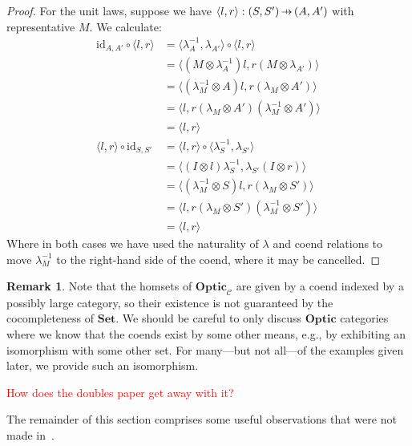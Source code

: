\documentclass[11pt,a4paper]{article}
\theoremstyle{plain}
\theoremstyle{definition}
\newtheorem{remark}[theorem]{Remark}
\newcommand{\C}{\mathscr{C}}
\newcommand{\Set}{\mathbf{Set}}
\newcommand{\Optic}{\mathbf{Optic}}
\newcommand{\id}{\mathrm{id}}
\newcommand{\hto}{\ensuremath{\,\mathaccent\shortmid\rightarrow\,}}
\newcommand{\todo}[1]{\textcolor{red}{\small #1}}
\begin{document}
\begin{proof}
  For the unit laws, suppose we have $\langle l, r \rangle : (S, S') \hto (A, A')$ with representative $M$. We calculate:
  \begin{align*}
    \id_{A, A'} \circ \langle l, r\rangle
    &= \langle \lambda^{-1}_A, \lambda_{A'} \rangle \circ \langle l, r\rangle \\
    &= \langle (M \otimes \lambda^{-1}_A) l, r (M\otimes  \lambda_{A'})\rangle \\
    &= \langle (\lambda^{-1}_M \otimes  A) l, r (\lambda_M \otimes A')\rangle \\
    &= \langle l, r (\lambda_M \otimes A') (\lambda^{-1}_M \otimes A')\rangle \\
    &= \langle l, r \rangle  \\
    \langle l, r \rangle \circ \id_{S, S'}
    &= \langle l, r \rangle \circ \langle \lambda^{-1}_S, \lambda_{S'}\rangle  \\
    &= \langle (I \otimes l)\lambda^{-1}_S, \lambda_{S'} (I \otimes r) \rangle \\
    &= \langle (\lambda^{-1}_M \otimes S)l, r (\lambda_{M} \otimes S') \rangle \\
    &= \langle l, r (\lambda_{M} \otimes S')(\lambda^{-1}_M \otimes S') \rangle \\
    &= \langle l, r \rangle
  \end{align*}
  Where in both cases we have used the naturality of $\lambda$ and coend relations to move $\lambda^{-1}_M$ to the right-hand side of the coend, where it may be cancelled.
\end{proof}

\begin{remark}
  Note that the homsets of $\Optic_\C$ are given by a coend indexed by a possibly large category, so their existence is not guaranteed by the cocompleteness of $\Set$. We should be careful to only discuss $\Optic$ categories where we know that the coends exist by some other means, e.g., by exhibiting an isomorphism with some other set. For many---but not all---of the examples given later, we provide such an isomorphism.

  \todo{How does the doubles paper get away with it?}
\end{remark}

The remainder of this section comprises some useful observations that were not made in~\cite{Doubles}.
\end{document}
